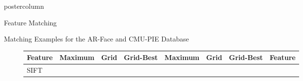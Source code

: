 \documentclass[final,hyperref={pdfpagelabels=false}]{beamer}
\begin{document}
\begin{frame}
\begin{columns}
\begin{column}{.49\textwidth}
\begin{beamercolorbox}[center,wd=\textwidth]{postercolumn}
\begin{minipage}[T]{.95\textwidth}
{\begin{block}{Feature Matching}
\begin{itemize}
              \end{itemize}
            \end{block}
            \vfill
            \begin{block}{Matching Examples for the AR-Face and CMU-PIE Database}
              \begin{figure}
                \footnotesize
                \centering
                \begin{tabular}{p{.09\linewidth} | p{.12\linewidth} | p{.12\linewidth} | p{.12\linewidth} || p{.12\linewidth} | p{.12\linewidth} | p{.12\linewidth} | p{.09\linewidth} }
                  Feature
                  &
                  Maximum
                  & 
                  Grid
                  & 
                  Grid-Best
                  &
                  Maximum
                  & 
                  Grid
                  & 
                  Grid-Best
                  & 
                  Feature
                  \\
                  \hline
                  SIFT 
                  &

\end{tabular}
\end{figure}
\end{block}}
\end{minipage}
\end{beamercolorbox}
\end{column}
\end{columns}
\end{frame}
\end{document}
